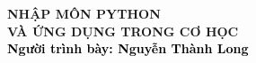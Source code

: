 \begin{frame}[noframenumbering]
    \thispagestyle{empty}
    \bfseries
    \begin{flushleft}
        \vfill
        \vspace{5mm}
        \textcolor{BlueDefault}{\huge \bfseries NHẬP MÔN PYTHON \\ VÀ ỨNG DỤNG TRONG CƠ HỌC} \\
        \vspace{8mm}
        \textcolor{black}{\large \bfseries Người trình bày: Nguyễn Thành Long}
        \vfill
    \end{flushleft}
\end{frame}